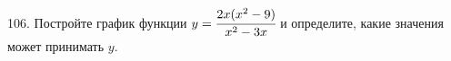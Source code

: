106. Постройте график функции $y=\cfrac{2x(x^2-9)}{x^2-3x}$ и определите, какие значения может принимать $y.$\\
